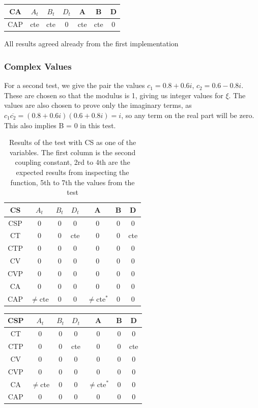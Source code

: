 \documentclass[twocolumn]{article}
\begin{document}
\begin{table}[H]
	\begin{tabular}{|c|c|c|c|c|c|c|}
		\hline
		CA & $A_t$ & $B_t$ & $D_t$ & A & B & D \\
		\hline
		CAP & cte & cte & 0 & cte & cte & 0\\
		\hline
	\end{tabular}
\end{table}

All results agreed already from the first implementation

\subsubsection{Complex Values}

For a second test, we give the pair the values $c_1 = 0.8 + 0.6i$, $c_2 = 0.6 - 0.8i$. These are chosen so that the modulus is 1, giving us integer values for $\xi$. The values are also chosen to prove only the imaginary terms, as $c_1\overline{c_2} = (0.8+0.6i)(0.6+0.8i) = i$, so any term on the real part will be zero. This also implies B = 0 in this test.

\begin{table}[H]
	\begin{tabular}{|c|c|c|c|c|c|c|}
		\hline
		CS & $A_t$ & $B_t$ & $D_t$ & A & B & D \\
		\hline
		CSP & 0 & 0 & 0 & 0 & 0 & 0\\
		\hline
		CT & 0 & 0 & cte & 0 & 0 & cte\\
		\hline
		CTP & 0 & 0 & 0 & 0 & 0 & 0\\
		\hline
		CV & 0 & 0 & 0 & 0 & 0 & 0\\
		\hline
		CVP & 0 & 0 & 0 & 0 & 0 & 0\\
		\hline
		CA & 0 & 0 & 0 & 0 & 0 & 0\\
		\hline
		CAP & $\neq$cte & 0 & 0 & $\neq$cte$^\ast$ & 0 & 0\\ %
		\hline
	\end{tabular}
	\caption{Results of the test with CS as one of the variables. The first column is the second coupling constant, 2rd to 4th are the expected results from inspecting the function, 5th to 7th the values from the test}
\end{table}

\begin{table}[H]
	\begin{tabular}{|c|c|c|c|c|c|c|}
		\hline
		CSP & $A_t$ & $B_t$ & $D_t$ & A & B & D \\
		\hline
		CT & 0 & 0 & 0 & 0 & 0  & 0\\
		\hline
		CTP& 0 & 0 & cte & 0 & 0 & cte\\
		\hline
		CV & 0 & 0 & 0 & 0 & 0 & 0\\
		\hline
		CVP & 0 & 0 & 0 & 0 & 0 & 0\\
		\hline
		CA & $\neq$cte & 0 & 0 & $\neq$cte$^\ast$ & 0 & 0\\  %
		\hline
		CAP & 0 & 0 & 0 & 0 & 0 & 0\\
		\hline
	\end{tabular}
\end{table}
\end{document}
